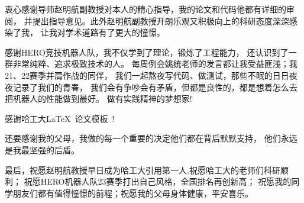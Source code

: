 \begin{acknowledgements}
衷心感谢导师赵明航副教授对本人的精心指导，我的论文和代码他都有详细的审阅，
并提出指导意见。此外赵明航副教授开朗乐观又积极向上的科研态度深深感染了我，
让我对学术道路有了更大的憧憬。
\par
感谢HERO竞技机器人队，我不仅学到了理论，锻炼了工程能力，
还认识到了一群非常纯粹、追求极致技术的人。
每周例会姚统老师的发言都让我受益匪浅；我21、22赛季并肩作战的同伴，
我们一起熬夜写代码、做测试，那些不眠的日日夜夜记录了我们的青春，
我们会有争吵会有矛盾，但都是良性的，都是想着怎么去把机器人的性能做到最好。
做有实践精神的梦想家!

\par
感谢哈工大\LaTeX\ 论文模板\hithesis\ !


\par
还要感谢我的父母，我做的每一个重要的决定他们都在背后默默支持，
他们永远是我最坚强的后盾。
\par
最后，祝愿赵明航教授早日成为哈工大引用第一人,祝愿哈工大的老师们科研顺利；
祝愿HERO机器人队23赛季打出自己风格，全国排名再创新高；
祝愿我的同学朋友们都有值得憧憬的前程；祝愿我的父母身体健康，平安喜乐。
\end{acknowledgements}
